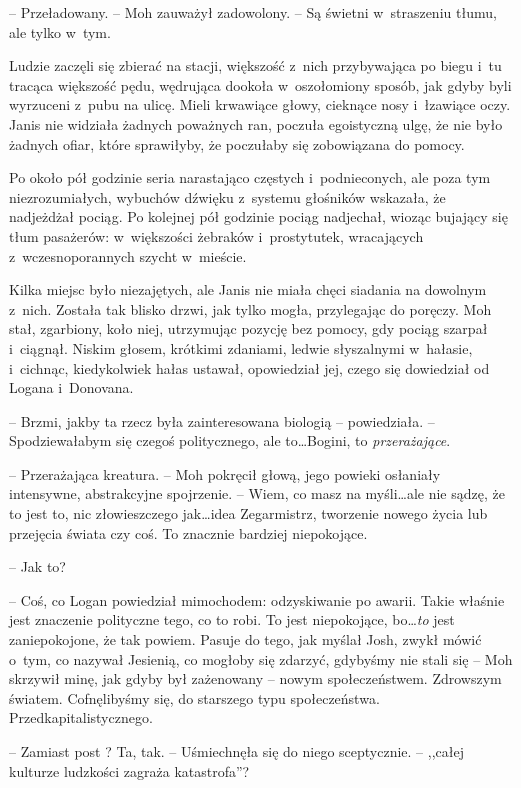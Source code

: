 \documentclass[oneside,polish,11pt,sfheadings]{mwbk}
\begin{document}
-- Przeładowany. -- Moh zauważył zadowolony. -- Są świetni w~straszeniu
tłumu, ale tylko w~tym.

Ludzie zaczęli się zbierać na stacji, większość z~nich przybywająca po
biegu i~tu tracąca większość pędu, wędrująca dookoła w~oszołomiony
sposób, jak gdyby byli wyrzuceni z~pubu na ulicę. Mieli krwawiące głowy,
cieknące nosy i~łzawiące oczy. Janis nie widziała żadnych poważnych ran,
poczuła egoistyczną ulgę, że nie było żadnych ofiar, które sprawiłyby,
że poczułaby się zobowiązana do pomocy.

Po około pół godzinie seria narastająco częstych i~podnieconych, ale
poza tym niezrozumiałych, wybuchów dźwięku z~systemu głośników wskazała,
że nadjeżdżał pociąg. Po kolejnej pół godzinie pociąg nadjechał, wioząc
bujający się tłum pasażerów: w~większości żebraków i~prostytutek,
wracających z~wczesnoporannych szycht w~mieście.

Kilka miejsc było niezajętych, ale Janis nie miała chęci siadania na
dowolnym z~nich. Została tak blisko drzwi, jak tylko mogła, przylegając
do poręczy. Moh stał, zgarbiony, koło niej, utrzymując pozycję bez
pomocy, gdy pociąg szarpał i~ciągnął. Niskim głosem, krótkimi zdaniami,
ledwie słyszalnymi w~hałasie, i~cichnąc, kiedykolwiek hałas ustawał,
opowiedział jej, czego się dowiedział od Logana i~Donovana.

-- Brzmi, jakby ta rzecz była zainteresowana biologią -- powiedziała. -- Spodziewałabym się czegoś politycznego, ale to\ldots Bogini, to
\emph{przerażające}.

-- Przerażająca kreatura. -- Moh pokręcił głową, jego powieki osłaniały
intensywne, abstrakcyjne spojrzenie. -- Wiem, co masz na myśli\ldots ale nie
sądzę, że to jest to, nic złowieszczego jak\ldots idea Zegarmistrz,
tworzenie nowego życia lub przejęcia świata czy coś. To znacznie
bardziej niepokojące.

-- Jak to?

-- Coś, co Logan powiedział mimochodem: odzyskiwanie po awarii. Takie
właśnie jest znaczenie polityczne tego, co to robi. To jest niepokojące,
bo\ldots \emph{to} jest zaniepokojone, że tak powiem. Pasuje do tego, jak
myślał Josh, zwykł mówić o~tym, co nazywał Jesienią, co mogłoby się
zdarzyć, gdybyśmy nie stali się -- Moh skrzywił minę, jak gdyby był
zażenowany -- nowym społeczeństwem. Zdrowszym światem. Cofnęlibyśmy się,
do starszego typu społeczeństwa. Przedkapitalistycznego.

-- Zamiast post ? Ta, tak. -- Uśmiechnęła się do niego sceptycznie. -- ,,całej kulturze ludzkości zagraża katastrofa''?
\end{document}
